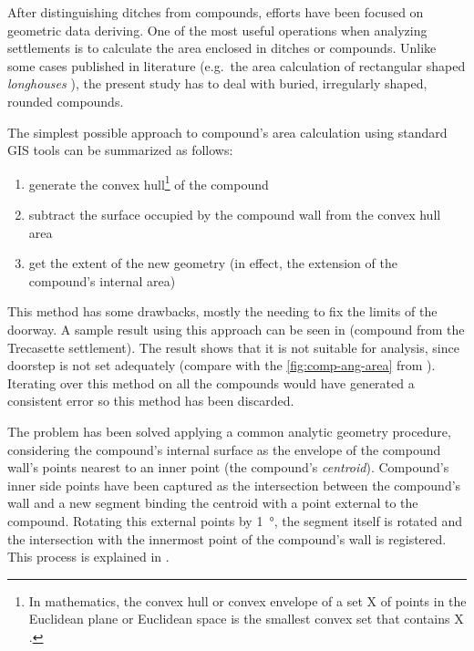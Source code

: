             After distinguishing ditches from compounds, efforts have been focused on geometric data deriving. One of the most useful operations when analyzing settlements is to calculate the area enclosed in ditches or compounds. Unlike some cases published in literature (e.g.\ the area calculation of rectangular shaped \emph{longhouses} \cite{spatial-south-europe}), the present study has to deal with buried, irregularly shaped, rounded compounds.

            The simplest possible approach to compound's area calculation using standard GIS tools can be summarized as follows:
            
            \begin{enumerate}
                \item generate the convex hull\footnote{In mathematics, the convex hull or convex envelope of a set X of points in the Euclidean plane or Euclidean space is the smallest convex set that contains X \cite{wiki:hull}.} of the compound
                \item subtract the surface occupied by the compound wall from the convex hull area
                \item get the extent of the new geometry (in effect, the extension of the compound's internal area)
            \end{enumerate}

            This method has some drawbacks, mostly the needing to fix the limits of the doorway. A sample result using this approach can be seen in  (compound from the Trecasette settlement). The result shows that it is not suitable for analysis, since doorstep is not set adequately (compare  with the \ref{fig:comp-ang-area} from %
            ). Iterating over this method on all the compounds would have generated a consistent error so this method has been discarded.

            The problem has been solved applying a common analytic geometry procedure, considering the compound's internal surface as the envelope of the compound wall's points nearest to an inner point (the compound's \emph{centroid}). Compound's inner side points have been captured as the intersection between the compound's wall and a new segment binding the centroid with a point external to the compound. Rotating this external points by \SI{1}{\degree}, the segment itself is rotated and the intersection with the innermost point of the compound's wall is registered. This process is explained in .
            
